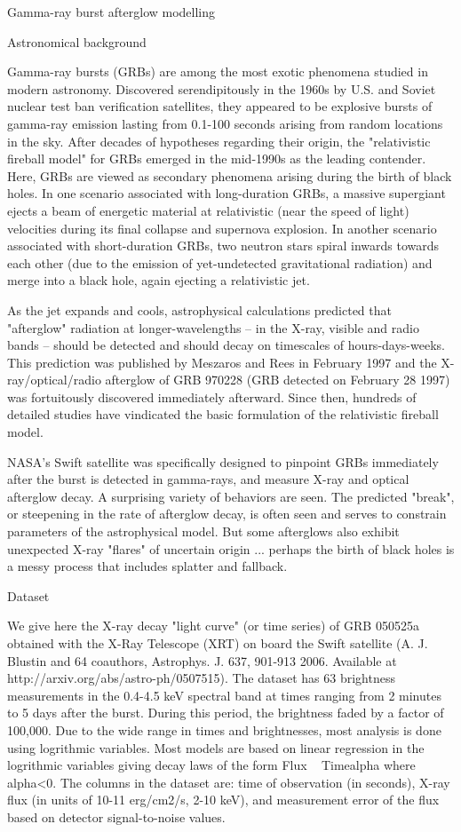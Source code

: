 Gamma-ray burst afterglow modelling

Astronomical background

Gamma-ray bursts (GRBs) are among the most exotic phenomena studied in modern astronomy. Discovered serendipitously in the 1960s by U.S. and Soviet nuclear test ban verification satellites, they appeared to be explosive bursts of gamma-ray emission lasting from 0.1-100 seconds arising from random locations in the sky. After decades of hypotheses regarding their origin, the "relativistic fireball model" for GRBs emerged in the mid-1990s as the leading contender. Here, GRBs are viewed as secondary phenomena arising during the birth of black holes. In one scenario associated with long-duration GRBs, a massive supergiant ejects a beam of energetic material at relativistic (near the speed of light) velocities during its final collapse and supernova explosion. In another scenario associated with short-duration GRBs, two neutron stars spiral inwards towards each other (due to the emission of yet-undetected gravitational radiation) and merge into a black hole, again ejecting a relativistic jet.

As the jet expands and cools, astrophysical calculations predicted that "afterglow" radiation at longer-wavelengths -- in the X-ray, visible and radio bands -- should be detected and should decay on timescales of hours-days-weeks. This prediction was published by Meszaros and Rees in February 1997 and the X-ray/optical/radio afterglow of GRB 970228 (GRB detected on February 28 1997) was fortuitously discovered immediately afterward. Since then, hundreds of detailed studies have vindicated the basic formulation of the relativistic fireball model.

NASA's Swift satellite was specifically designed to pinpoint GRBs immediately after the burst is detected in gamma-rays, and measure X-ray and optical afterglow decay. A surprising variety of behaviors are seen. The predicted "break", or steepening in the rate of afterglow decay, is often seen and serves to constrain parameters of the astrophysical model. But some afterglows also exhibit unexpected X-ray "flares" of uncertain origin ... perhaps the birth of black holes is a messy process that includes splatter and fallback.

Dataset

We give here the X-ray decay "light curve" (or time series) of GRB 050525a obtained with the X-Ray Telescope (XRT) on board the Swift satellite (A. J. Blustin and 64 coauthors, Astrophys. J. 637, 901-913 2006. Available at http://arxiv.org/abs/astro-ph/0507515). The dataset has 63 brightness measurements in the 0.4-4.5 keV spectral band at times ranging from 2 minutes to 5 days after the burst. During this period, the brightness faded by a factor of 100,000. Due to the wide range in times and brightnesses, most analysis is done using logrithmic variables. Most models are based on linear regression in the logrithmic variables giving decay laws of the form Flux ~ Timealpha where alpha<0. The columns in the dataset are: time of observation (in seconds), X-ray flux (in units of 10-11 erg/cm2/s, 2-10 keV), and measurement error of the flux based on detector signal-to-noise values.

